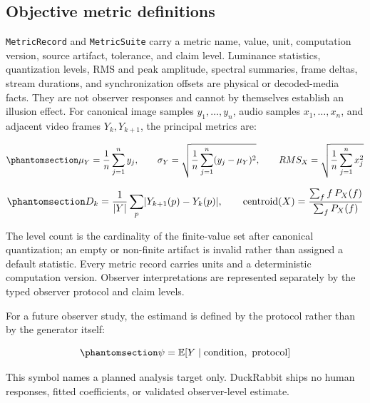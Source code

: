 \documentclass[
  english,
]{article}
\begin{document}
\subsection{Objective metric
definitions}\label{sec:objective_metric_definitions}

\texttt{MetricRecord} and \texttt{MetricSuite} carry a metric name,
value, unit, computation version, source artifact, tolerance, and claim
level. Luminance statistics, quantization levels, RMS and peak
amplitude, spectral summaries, frame deltas, stream durations, and
synchronization offsets are physical or decoded-media facts. They are
not observer responses and cannot by themselves establish an illusion
effect. For canonical image samples \(y_1,\ldots,y_n\), audio samples
\(x_1,\ldots,x_n\), and adjacent video frames \(Y_k,Y_{k+1}\), the
principal metrics are:

\begin{equation}\protect\phantomsection\label{eq:objective_statistics}{
\mu_Y = \frac{1}{n}\sum_{j=1}^{n} y_j, \qquad
\sigma_Y = \sqrt{\frac{1}{n}\sum_{j=1}^{n}(y_j-\mu_Y)^2}, \qquad
RMS_X = \sqrt{\frac{1}{n}\sum_{j=1}^{n}x_j^2}
}\end{equation}

\begin{equation}\protect\phantomsection\label{eq:temporal_spectral_metrics}{
D_k = \frac{1}{\lvert Y\rvert}\sum_{p}\lvert Y_{k+1}(p)-Y_k(p)\rvert, \qquad
\mathrm{centroid}(X) = \frac{\sum_f f\,P_X(f)}{\sum_f P_X(f)}
}\end{equation}

The level count is the cardinality of the finite-value set after
canonical quantization; an empty or non-finite artifact is invalid
rather than assigned a default statistic. Every metric record carries
units and a deterministic computation version. Observer interpretations
are represented separately by the typed observer protocol and claim
levels.

For a future observer study, the estimand is defined by the protocol
rather than by the generator itself:

\begin{equation}\protect\phantomsection\label{eq:observer_estimand}{
\psi = \mathbb{E}[Y \mid \mathrm{condition},\ \mathrm{protocol}]
}\end{equation}

This symbol names a planned analysis target only. DuckRabbit ships no
human responses, fitted coefficients, or validated observer-level
estimate.
\end{document}
